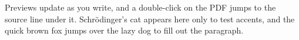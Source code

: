 Previews update as you write, and a double-click on the PDF jumps to the
source line under it. Schr\"odinger's cat appears here only to test accents,
and the quick brown fox jumps over the lazy dog to fill out the paragraph.

\par
